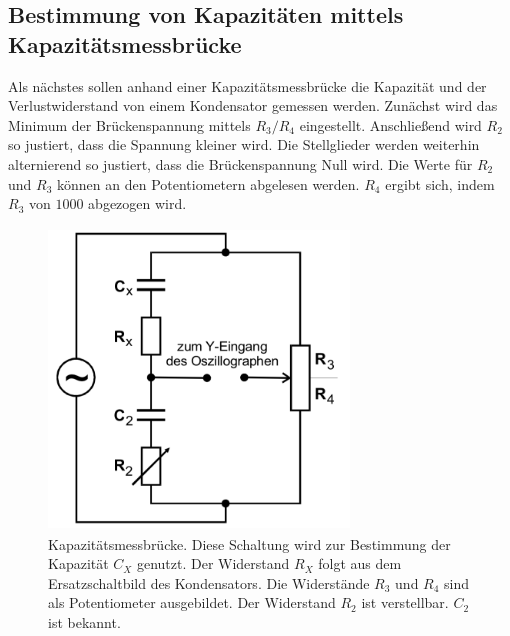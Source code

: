 \subsection{Bestimmung von Kapazitäten mittels Kapazitätsmessbrücke}
Als nächstes sollen anhand einer Kapazitätsmessbrücke die Kapazität und der 
Verlustwiderstand von einem Kondensator gemessen werden.
\newline
Zunächst wird das Minimum der Brückenspannung mittels $R_3/R_4$ eingestellt.
Anschließend wird $R_2$ so justiert, dass die Spannung kleiner wird.
Die Stellglieder werden weiterhin alternierend so justiert, dass die
Brückenspannung Null wird. Die Werte für $R_2$ und $R_3$ können an den
Potentiometern abgelesen werden. $R_4$ ergibt sich, indem $R_3$ von 
$\num{1000}$ abgezogen wird.
\begin{figure}
    \centering
    \includegraphics[width=8cm, height=8cm]{build/kapazitaet.png}
    \caption{Kapazitätsmessbrücke. Diese Schaltung wird zur Bestimmung
    der Kapazität $C_X$ genutzt. Der Widerstand $R_X$ folgt aus dem
    Ersatzschaltbild des Kondensators. Die Widerstände $R_3$ und $R_4$
    sind als Potentiometer ausgebildet. Der Widerstand $R_2$ ist
    verstellbar. $C_2$ ist bekannt.}
    \label{kapazitaet}
\end{figure}

